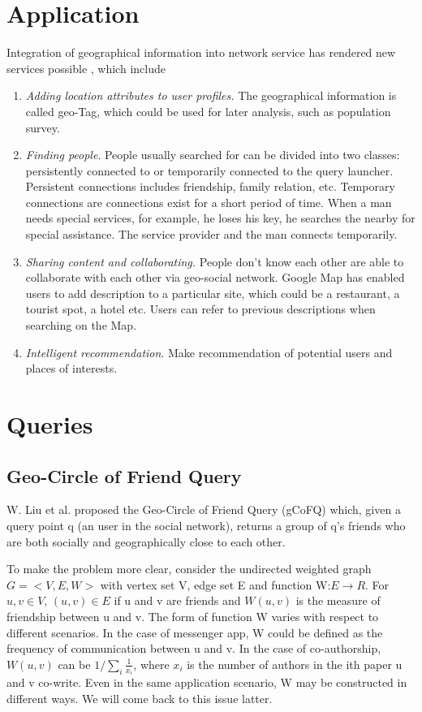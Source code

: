 
\section{Application}
Integration of geographical information into network service has rendered new services possible \cite{Huang}, which include 
\begin{enumerate}
\item \textit{Adding location attributes to user profiles.} The geographical information is called geo-Tag, which could be used for later analysis, such as population survey.

\item \textit{Finding people}. People usually searched for can be divided into two classes: persistently connected to or temporarily connected to the query launcher. Persistent connections includes friendship, family relation, etc. Temporary connections are connections exist for a short period of time. When a man needs special services, for example, he loses his key, he searches the nearby for special assistance. The service provider and the man connects temporarily. 

\item \textit{Sharing content and collaborating.} People don't know each other are able to collaborate with each other via geo-social network. Google Map has enabled users to add description to a particular site, which could be a restaurant, a tourist spot, a hotel etc. Users can refer to previous descriptions when searching on the Map.

\item \textit{Intelligent recommendation}. Make recommendation of potential users and places of interests.
\end{enumerate}

\section{Queries}
\subsection{Geo-Circle of Friend Query}

W. Liu et al. \cite{Liu} proposed the Geo-Circle of Friend Query (gCoFQ) which, given a query point q (an user in the social network), returns a group of q's friends who are both socially and geographically close to each other. 

To make the problem more clear, consider the undirected weighted graph $G=<V,E,W>$ with vertex set V, edge set E and function W:$E \to R$. For $u, v \in V$, $(u, v) \in E$ if u and v are friends and $W(u,v)$ is the measure of friendship between u and v. The form of function W varies with respect to different scenarios. In the case of messenger app, W could be defined as the frequency of communication between u and v. In the case of co-authorship, $W(u,v)$ can be ${1} / {\sum_i \frac{1}{x_i}}$, where $x_i$ is the number of authors in the ith paper u and v co-write. Even in the same application scenario, W may be constructed in different ways. We will come back to this issue latter.
	
